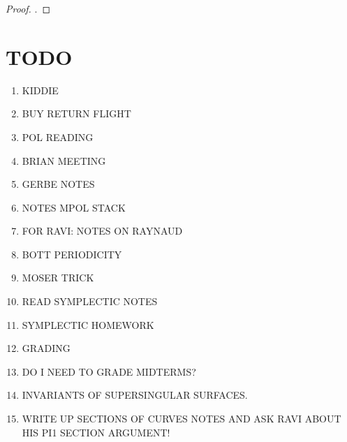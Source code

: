 \documentclass[12pt]{article}
\begin{document}
\begin{proof}
.
\end{proof}














\section{TODO}

\begin{enumerate}
\item KIDDIE
\item BUY RETURN FLIGHT
\item POL READING
\item BRIAN MEETING
\item GERBE NOTES
\item NOTES MPOL STACK
\item FOR RAVI: NOTES ON RAYNAUD
\item BOTT PERIODICITY
\item MOSER TRICK
\item READ SYMPLECTIC NOTES
\item SYMPLECTIC HOMEWORK
\item GRADING
\item DO I NEED TO GRADE MIDTERMS?
\item INVARIANTS OF SUPERSINGULAR SURFACES.
\item WRITE UP SECTIONS OF CURVES NOTES AND ASK RAVI ABOUT HIS PI1 SECTION ARGUMENT!
\end{enumerate}
\end{document}
